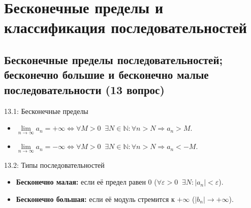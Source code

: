\documentclass[a4paper,12pt]{article}
\begin{document}
	
	
	
	
	
	\newpage
	\section{Бесконечные пределы и классификация последовательностей}
	
	\subsection{Бесконечные пределы последовательностей; бесконечно большие и бесконечно малые последовательности (13 вопрос)}
	
	\begin{definitionbox}{13.1: Бесконечные пределы}
		\begin{itemize}
			\item $\lim\limits_{n \to \infty} a_n = +\infty \iff \forall M > 0 \;\; \exists N \in \mathbb{N} \colon \forall n > N \Rightarrow a_n > M$.
			\item $\lim\limits_{n \to \infty} a_n = -\infty \iff \forall M > 0 \;\; \exists N \in \mathbb{N} \colon \forall n > N \Rightarrow a_n < -M$.
		\end{itemize}
	\end{definitionbox}
	
	\begin{definitionbox}{13.2: Типы последовательностей}
		\begin{itemize}
			\item \textbf{Бесконечно малая:} если её предел равен $0$ ($\forall \varepsilon > 0 \;\; \exists N \colon |a_n| < \varepsilon$).
			\item \textbf{Бесконечно большая:} если её модуль стремится к $+\infty$ ($|b_n| \to +\infty$).
		\end{itemize}
	\end{definitionbox}
	
	\begin{center}
	\end{center}
	
\end{document}
